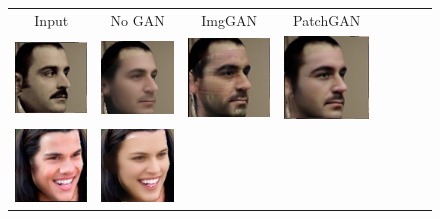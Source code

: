 \begin{figure}[t!]
\begin{center}
\small
\setlength{\tabcolsep}{3pt}
\begin{tabular}{c@{\hskip 1.5mm}c@{\hskip 1mm}c@{\hskip 1.5mm}c@{\hskip 1mm}c@{\hskip 1.5mm}c@{\hskip 1mm}c@{\hskip 1mm}c@{}}
Input & No GAN & ImgGAN& PatchGAN \\
\includegraphics[width=\AblTexFigWid]{img/Ablation/Input1.png} &
\includegraphics[width=\AblTexFigWid]{img/Ablation/ImgNoGAN1.png} &
\includegraphics[width=\AblTexFigWid]{img/Ablation/ImgGAN1.png} &
\includegraphics[width=\AblTexFigWid]{img/Ablation/PatchGAN1.png} &
\\
\includegraphics[width=\AblTexFigWid]{img/Ablation/Input2.png} &
\includegraphics[width=\AblTexFigWid]{img/Ablation/ImgNoGAN2.png} &

\end{tabular}
\end{center}
\end{figure}
